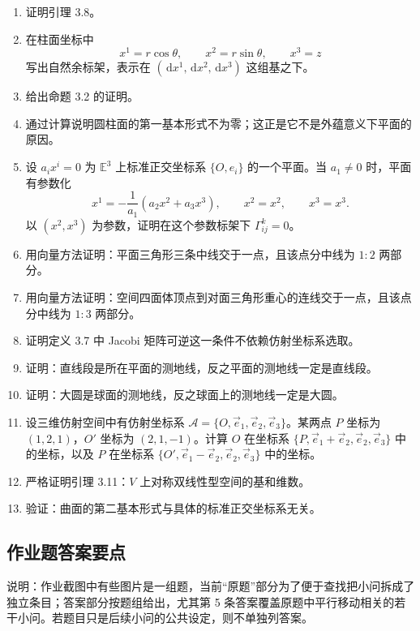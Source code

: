 \documentclass[UTF8,12pt,a4paper]{ctexart}
\newcommand{\E}{\mathbb E}
\newcommand{\A}{\mathcal A}
\newcommand{\dd}{\,\mathrm d}
\begin{document}
\begin{enumerate}
\item 证明引理 3.8。

\item 在柱面坐标中
\[
x^1=r\cos\theta,\qquad x^2=r\sin\theta,\qquad x^3=z
\]
写出自然余标架，表示在 $(\dd x^1,\dd x^2,\dd x^3)$ 这组基之下。

\item 给出命题 3.2 的证明。

\item 通过计算说明圆柱面的第一基本形式不为零；这正是它不是外蕴意义下平面的原因。

\item 设 $a_ix^i=0$ 为 $\E^3$ 上标准正交坐标系 $\{O,e_i\}$ 的一个平面。当 $a_1\ne0$ 时，平面有参数化
\[
x^1=-\frac1{a_1}(a_2x^2+a_3x^3),\qquad x^2=x^2,\qquad x^3=x^3.
\]
以 $(x^2,x^3)$ 为参数，证明在这个参数标架下 $\Gamma^k_{ij}=0$。

\item 用向量方法证明：平面三角形三条中线交于一点，且该点分中线为 $1:2$ 两部分。

\item 用向量方法证明：空间四面体顶点到对面三角形重心的连线交于一点，且该点分中线为 $1:3$ 两部分。

\item 证明定义 3.7 中 Jacobi 矩阵可逆这一条件不依赖仿射坐标系选取。

\item 证明：直线段是所在平面的测地线，反之平面的测地线一定是直线段。

\item 证明：大圆是球面的测地线，反之球面上的测地线一定是大圆。

\item 设三维仿射空间中有仿射坐标系 $\A=\{O,\vec e_1,\vec e_2,\vec e_3\}$。某两点 $P$ 坐标为 $(1,2,1)$，$O'$ 坐标为 $(2,1,-1)$。计算 $O$ 在坐标系 $\{P,\vec e_1+\vec e_2,\vec e_2,\vec e_3\}$ 中的坐标，以及 $P$ 在坐标系 $\{O',\vec e_1-\vec e_2,\vec e_2,\vec e_3\}$ 中的坐标。

\item 严格证明引理 3.11：$V$ 上对称双线性型空间的基和维数。

\item 验证：曲面的第二基本形式与具体的标准正交坐标系无关。
\end{enumerate}

\subsection{作业题答案要点}
说明：作业截图中有些图片是一组题，当前“原题”部分为了便于查找把小问拆成了独立条目；答案部分按题组给出，尤其第 5 条答案覆盖原题中平行移动相关的若干小问。若题目只是后续小问的公共设定，则不单独列答案。
\end{document}
